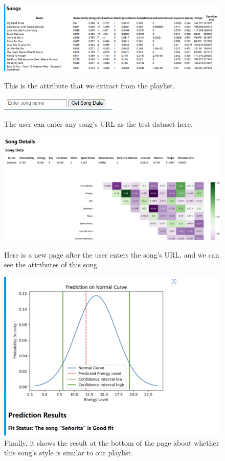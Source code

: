 \documentclass{article}
\begin{document}
\begin{figure}[h]
\centering
\includegraphics[width=1\textwidth]{2.png}
\caption{This is the attribute that we extract from the playlist.}
\includegraphics[width=0.5\textwidth]{3.png}
\caption{The user can enter any song's URL as the test dataset here.}
\includegraphics[width=1\textwidth]{4.png}
\caption{Here is a new page after the user enters the song's URL, and we can see the attributes of this song.}
\includegraphics[width=1\textwidth]{5.png}
\caption{Finally, it shows the result at the bottom of the page about whether this song's style is similar to our playlist.}
\label{fig:enter-label}
\end{figure}
\clearpage
\end{document}
